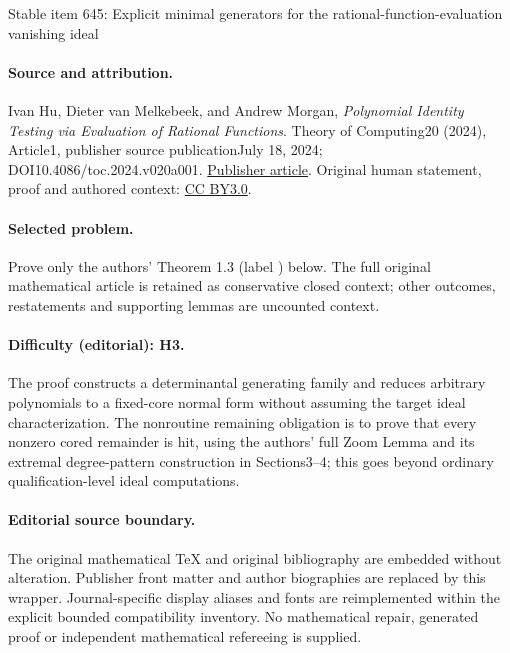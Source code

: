 \documentclass[11pt]{article}
\numberwithin{equation}{section}
\theoremstyle{definition}
\theoremstyle{plain}
\begin{document}
\begin{center}{\Large Stable item 645: Explicit minimal generators for the rational-function-evaluation vanishing ideal}\end{center}
\paragraph{Source and attribution.}
Ivan Hu, Dieter van Melkebeek, and Andrew Morgan, \emph{Polynomial Identity Testing via Evaluation of Rational Functions}. Theory of Computing20 (2024), Article1, publisher source publicationJuly 18, 2024; DOI10.4086/toc.2024.v020a001. \href{https://theoryofcomputing.org/articles/v020a001/}{Publisher article}. Original human statement, proof and authored context: \href{https://creativecommons.org/licenses/by/3.0/}{CC BY3.0}.
\paragraph{Selected problem.}
Prove only the authors' Theorem 1.3 (label ) below. The full original mathematical article is retained as conservative closed context; other outcomes, restatements and supporting lemmas are uncounted context.
\paragraph{Difficulty (editorial): H3.}
The proof constructs a determinantal generating family and reduces arbitrary polynomials to a fixed-core normal form without assuming the target ideal characterization. The nonroutine remaining obligation is to prove that every nonzero cored remainder is hit, using the authors’ full Zoom Lemma and its extremal degree-pattern construction in Sections3–4; this goes beyond ordinary qualification-level ideal computations.
\paragraph{Editorial source boundary.}
The original mathematical TeX and original bibliography are embedded without alteration. Publisher front matter and author biographies are replaced by this wrapper. Journal-specific display aliases and fonts are reimplemented within the explicit bounded compatibility inventory. No mathematical repair, generated proof or independent mathematical refereeing is supplied.
\clearpage

%
%
%


%
%
%
\end{document}
